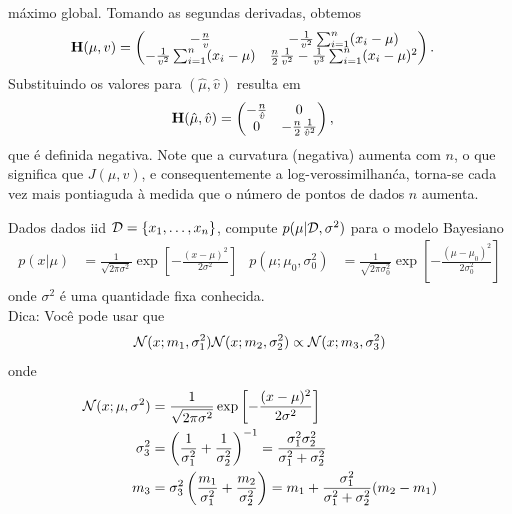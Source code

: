\begin{exenumerate}
\begin{solution}
        m\'aximo global. Tomando as segundas derivadas, obtemos
        \begin{align}
            \mathbf{H}(\mu, v) & = \begin{pmatrix}
                -\frac{n}{v} & -\frac{1}{v^2} \sum_{i=1}^n (x_i-\mu)\\
                -\frac{1}{v^2} \sum_{i=1}^n (x_i-\mu) & \frac{n}{2} \frac{1}{v^2} - \frac{1}{v^3} \sum_{i=1}^n (x_i-\mu)^2
            \end{pmatrix}.
        \end{align}
        Substituindo os valores para $(\hat{\mu}, \hat{v})$ resulta em
        \begin{align}
            \mathbf{H}(\hat{\mu}, \hat{v}) & = \begin{pmatrix}
                -\frac{n}{\hat{v}} & 0 \\
                0 & -\frac{n}{2} \frac{1}{\hat{v}^2}
            \end{pmatrix},
        \end{align}
        que \'e definida negativa. Note que a curvatura (negativa)
        aumenta com $n$, o que significa que $J(\mu, v)$, e
        consequentemente a log-verossimilhan\'ca, torna-se cada vez mais pontiaguda \`a medida que o
        n\'umero de pontos de dados $n$ aumenta.
    \end{solution}
    
\end{exenumerate}



 Dados dados iid $\mathcal{D} = \{x_1, \ldots, x_n\}$, compute $p(\mu | \mathcal{D}, \sigma^2)$ para o
modelo Bayesiano
\begin{align}
    p(x | \mu) &= \frac{1}{\sqrt{2\pi\sigma^2}}\exp\left[-\frac{(x-\mu)^2}{2\sigma^2}\right] &
    p(\mu; \mu_0, \sigma_0^2) &=  \frac{1}{\sqrt{2\pi\sigma_0^2}}\exp\left[-\frac{(\mu-\mu_0)^2}{2\sigma_0^2}\right]
\end{align}
onde $\sigma^2$ \'e uma quantidade fixa conhecida.\\
Dica: Voc\^e pode usar que
\begin{equation}
    \mathcal{N}(x ; m_1, \sigma_1^2) \mathcal{N}(x ; m_2, \sigma_2^2) \propto \mathcal{N}(x ; m_3, \sigma_3^2) \label{eq:Gaussian-mult-model-based-learning}
\end{equation}
onde 
\begin{align}
    \mathcal{N}(x ; \mu, \sigma^2) &= \frac{1}{\sqrt{2 \pi \sigma^2}} \exp\left[ -\frac{(x-\mu)^2}{2\sigma^2} \right]\\
    \sigma^2_3 & = \left( \frac{1}{\sigma_1^2} + \frac{1}{\sigma_2^2}\right)^{-1} = \frac{\sigma_1^2 \sigma_2^2}{\sigma_1^2+\sigma_2^2}\\
    m_3 & = \sigma_3^2\left( \frac{m_1}{\sigma_1^2}+ \frac{m_2}{\sigma_2^2}\right) = m_1 + \frac{\sigma_1^2}{\sigma_1^2+\sigma_2^2}(m_2-m_1) \label{eq:mu-mult-alt}
\end{align}

